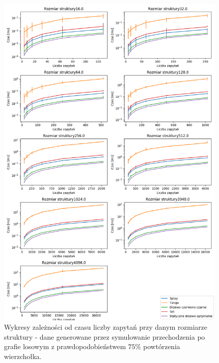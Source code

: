\documentclass[declaration,shortabstract]{iithesis}
\theoremstyle{thm}
\theoremstyle{remark}
\theoremstyle{plain}
\theoremstyle{plain}
\theoremstyle{plain}
\begin{document}
\begin{figure}[H]  
\centering
    \includegraphics[scale=0.5]{wykresy/randwalk25.png}
      \caption{Wykresy zależności od czasu liczby zapytań przy danym rozmiarze struktury - dane generowane przez symulowanie przechodzenia po grafie losowym z prawdopodobieństwem  \(75\%\) powtórzenia wierzchołka. }  
    \label{fig:zigzig} 
\end{figure}
\end{document}
